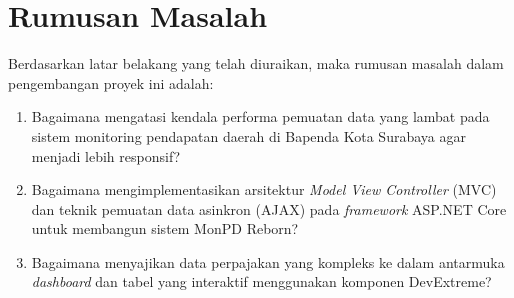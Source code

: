 \section{Rumusan Masalah}
\label{sec:rumusanmasalah}

Berdasarkan latar belakang yang telah diuraikan, maka rumusan masalah dalam pengembangan proyek ini adalah:
\begin{enumerate}
    \item Bagaimana mengatasi kendala performa pemuatan data yang lambat pada sistem monitoring pendapatan daerah di Bapenda Kota Surabaya agar menjadi lebih responsif?
    \item Bagaimana mengimplementasikan arsitektur \emph{Model View Controller} (MVC) dan teknik pemuatan data asinkron (AJAX) pada \emph{framework} ASP.NET Core untuk membangun sistem MonPD Reborn?
    \item Bagaimana menyajikan data perpajakan yang kompleks ke dalam antarmuka \emph{dashboard} dan tabel yang interaktif menggunakan komponen DevExtreme?
\end{enumerate}